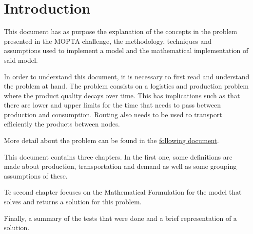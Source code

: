 \chapter{Introduction}

This document has as purpose the explanation of the concepts in the problem presented in the MOPTA challenge, the methodology, techniques and assumptions used to implement a model and the mathematical implementation of said model.

In order to understand this document, it is necessary to first read and understand the problem at hand. The problem consists on a logistics and production problem where the product quality decays over time. This has implications such as that there are lower and upper limits for the time that needs to pass between production and consumption. Routing also needs to be used to transport efficiently the products between nodes.

More detail about the problem can be found in the \href{http://coral.ie.lehigh.edu/~mopta/AIMMS_MOPTA_case_2017.pdf}{following document}.

This document contains three chapters. In the first one, some definitions are made about production, transportation and demand as well as some grouping assumptions of these.

Te second chapter focuses on the Mathematical Formulation for the model that solves and returns a solution for this problem.

Finally, a summary of the tests that were done and a brief representation of a solution.
